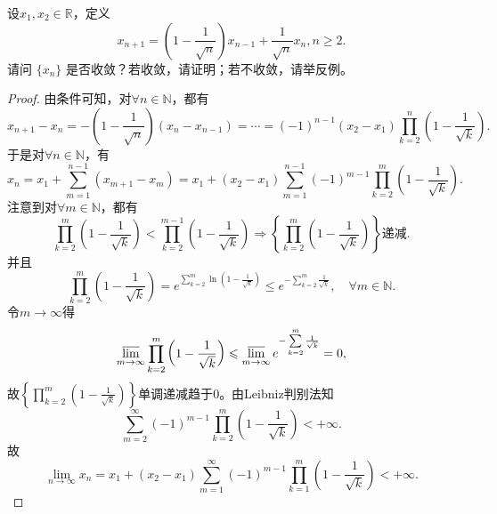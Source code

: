 \documentclass[../../main.tex]{subfiles}%
\begin{document}
\begin{example}
设$x_1, x_2 \in \mathbb{R}$，定义
$$x_{n+1} = \left(1 - \frac{1}{\sqrt{n}}\right)x_{n-1} + \frac{1}{\sqrt{n}}x_n, n \geqslant 2.$$
请问 $\{x_n\}$ 是否收敛？若收敛，请证明；若不收敛，请举反例。
\end{example}
\begin{proof}

由条件可知，对$\forall n\in \mathbb{N}$，都有
$$x_{n+1} - x_n = -\left(1 - \frac{1}{\sqrt{n}}\right)\left(x_n - x_{n-1}\right) = \cdots = (-1)^{n-1}\left(x_2 - x_1\right)\prod_{k=2}^n \left(1 - \frac{1}{\sqrt{k}}\right).$$
于是对$\forall n\in \mathbb{N}$，有
$$x_n = x_1 + \sum\limits_{m=1}^{n-1} \left(x_{m+1} - x_m\right) = x_1 + \left(x_2 - x_1\right)\sum\limits_{m=1}^{n-1} (-1)^{m-1}\prod_{k=2}^m \left(1 - \frac{1}{\sqrt{k}}\right).$$
注意到对$\forall m\in \mathbb{N}$，都有
$$\prod_{k=2}^m \left(1 - \frac{1}{\sqrt{k}}\right) < \prod_{k=2}^{m-1} \left(1 - \frac{1}{\sqrt{k}}\right) \Longrightarrow \left\{ \prod_{k=2}^m \left(1 - \frac{1}{\sqrt{k}}\right) \right\} \text{递减}.$$
并且
$$\prod_{k=2}^m \left(1 - \frac{1}{\sqrt{k}}\right) = e^{\sum\limits_{k=2}^m \ln\left(1 - \frac{1}{\sqrt{k}}\right)} \leqslant e^{-\sum\limits_{k=2}^m \frac{1}{\sqrt{k}}}, \quad \forall m\in \mathbb{N}.$$
令$m\rightarrow \infty$得
$$\varlimsup_{m\rightarrow \infty} \prod_{k=2}^m \left(1 - \frac{1}{\sqrt{k}}\right) \leqslant \varlimsup_{m\rightarrow \infty} e^{-\sum\limits_{k=2}^m \frac{1}{\sqrt{k}}} = 0,$$
故$\left\{ \prod_{k=2}^m \left(1 - \frac{1}{\sqrt{k}}\right) \right\}$单调递减趋于$0$。由Leibniz判别法知
$$\sum\limits_{m=2}^{\infty} (-1)^{m-1}\prod_{k=2}^m \left(1 - \frac{1}{\sqrt{k}}\right) < +\infty.$$
故
$$\lim_{n\rightarrow \infty} x_n = x_1 + \left(x_2 - x_1\right)\sum\limits_{m=1}^{\infty} (-1)^{m-1}\prod_{k=1}^m \left(1 - \frac{1}{\sqrt{k}}\right) < +\infty.$$

\end{proof}
\end{document}

